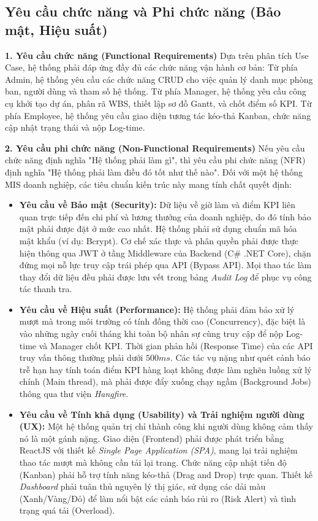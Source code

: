 \documentclass[a4paper,13.5pt]{extreport}
\begin{document}
\subsection{Yêu cầu chức năng và Phi chức năng (Bảo mật, Hiệu suất)}

\textbf{1. Yêu cầu chức năng (Functional Requirements)}
Dựa trên phân tích Use Case, hệ thống phải đáp ứng đầy đủ các chức năng vận hành cơ bản: 
Từ phía Admin, hệ thống yêu cầu các chức năng CRUD cho việc quản lý danh mục phòng ban, người dùng và tham số hệ thống. Từ phía Manager, hệ thống yêu cầu công cụ khởi tạo dự án, phân rã WBS, thiết lập sơ đồ Gantt, và chốt điểm số KPI. Từ phía Employee, hệ thống yêu cầu giao diện tương tác kéo-thả Kanban, chức năng cập nhật trạng thái và nộp Log-time.

\textbf{2. Yêu cầu phi chức năng (Non-Functional Requirements)}
Nếu yêu cầu chức năng định nghĩa "Hệ thống phải làm gì", thì yêu cầu phi chức năng (NFR) định nghĩa "Hệ thống phải làm điều đó tốt như thế nào". Đối với một hệ thống MIS doanh nghiệp, các tiêu chuẩn kiến trúc này mang tính chất quyết định:

\begin{itemize}
    \item \textbf{Yêu cầu về Bảo mật (Security):} Dữ liệu về giờ làm và điểm KPI liên quan trực tiếp đến chi phí và lương thưởng của doanh nghiệp, do đó tính bảo mật phải được đặt ở mức cao nhất. Hệ thống phải sử dụng chuẩn mã hóa mật khẩu (ví dụ: Bcrypt). Cơ chế xác thực và phân quyền phải được thực hiện thông qua JWT ở tầng Middleware của Backend (C\# .NET Core), chặn đứng mọi nỗ lực truy cập trái phép qua API (Bypass API). Mọi thao tác làm thay đổi dữ liệu đều phải được lưu vết trong bảng \textit{Audit Log} để phục vụ công tác thanh tra.
    
    \item \textbf{Yêu cầu về Hiệu suất (Performance):} Hệ thống phải đảm bảo xử lý mượt mà trong môi trường có tính đồng thời cao (Concurrency), đặc biệt là vào những ngày cuối tháng khi toàn bộ nhân sự cùng truy cập để nộp Log-time và Manager chốt KPI. Thời gian phản hồi (Response Time) của các API truy vấn thông thường phải dưới $500ms$. Các tác vụ nặng như quét cảnh báo trễ hạn hay tính toán điểm KPI hàng loạt không được làm nghẽn luồng xử lý chính (Main thread), mà phải được đẩy xuống chạy ngầm (Background Jobs) thông qua thư viện \textit{Hangfire}.
    
    \item \textbf{Yêu cầu về Tính khả dụng (Usability) và Trải nghiệm người dùng (UX):} Một hệ thống quản trị chỉ thành công khi người dùng không cảm thấy nó là một gánh nặng. Giao diện (Frontend) phải được phát triển bằng ReactJS với thiết kế \textit{Single Page Application (SPA)}, mang lại trải nghiệm thao tác mượt mà không cần tải lại trang. Chức năng cập nhật tiến độ (Kanban) phải hỗ trợ tính năng kéo-thả (Drag and Drop) trực quan. Thiết kế \textit{Dashboard} phải tuân thủ nguyên lý thị giác, sử dụng các dải màu (Xanh/Vàng/Đỏ) để làm nổi bật các cảnh báo rủi ro (Risk Alert) và tình trạng quá tải (Overload).
\end{itemize}
\end{document}
